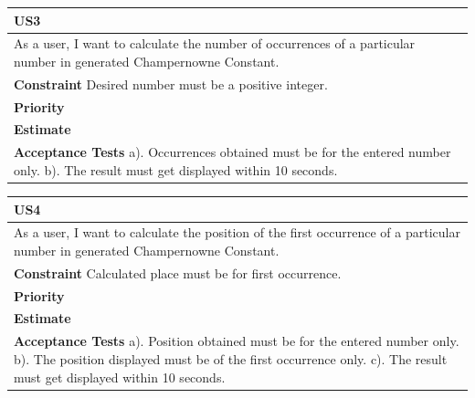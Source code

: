 \documentclass[paper=a4, fontsize=11pt]{report}
\numberwithin{equation}{section}		%
\numberwithin{figure}{section}			%
\numberwithin{table}{section}				%
\begin{document}
\begin{center}
\begin{tabular}{| m{15cm} |} 
\hline
\textbf{\large US3} \\ [0.7ex]
\hline\hline
As a user, I want to calculate the number of occurrences of a particular number in generated Champernowne Constant. \\
\hline
\textbf{Constraint} \newline Desired number must be a positive integer.  \\ 
\hline
\textbf{Priority} \newline 4 \\
\hline
\textbf{Estimate} \newline 13 \\
\hline
\textbf{Acceptance Tests} \newline a). Occurrences obtained must be for the entered number only.\newline
b). The result must get displayed within 10 seconds. \\
\hline
\end{tabular}
\end{center}
\vspace{1.5em}

\begin{center}
\begin{tabular}{| m{15cm} |} 
\hline
\textbf{\large US4} \\ [0.7ex]
\hline\hline
As a user, I want to calculate the position of the first occurrence of a particular number in generated Champernowne Constant. \\
\hline
\textbf{Constraint} \newline Calculated place must be for first occurrence.  \\
\hline
\textbf{Priority} \newline 4 \\
\hline
\textbf{Estimate} \newline 13 \\
\hline
\textbf{Acceptance Tests} \newline a). Position obtained must be for the entered number only.\newline
b). The position displayed must be of the first occurrence only.\newline
c). The result must get displayed within 10 seconds. \\
\hline
\end{tabular}
\end{center}
\vspace{1.5em}
\end{document}
